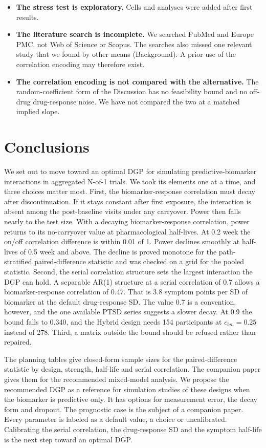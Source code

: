 \documentclass[
  11pt,
]{article}
\begin{document}
\begin{itemize}
  visits is inferred from its plasma half-life, not measured as a
  symptom-response half-life.
\item
  \textbf{The stress test is exploratory.} Cells and analyses were added
  after first results.
\item
  \textbf{The literature search is incomplete.} We searched PubMed and
  Europe PMC, not Web of Science or Scopus. The searches also missed
  one relevant study that we found by other means (Background). A
  prior use of the correlation encoding may therefore exist.
\item
  \textbf{The correlation encoding is not compared with the alternative.}
  The random-coefficient form of the Discussion has no feasibility
  bound and no off-drug drug-response noise. We have not compared the two at
  a matched implied slope.
\end{itemize}

\section{Conclusions}\label{conclusions}

We set out to move toward an optimal DGP for simulating
predictive-biomarker interactions in aggregated N-of-1 trials. We took
its elements one at a time, and three choices matter most. First, the
biomarker-response correlation must decay after discontinuation. If it
stays constant after first exposure, the interaction is absent among
the post-baseline visits under any carryover. Power then falls nearly
to the test size. With a decaying biomarker-response correlation,
power returns to its no-carryover value at pharmacological
half-lives. At 0.2 week the on/off correlation difference is within
0.01 of 1. Power declines smoothly at half-lives of 0.5 week and
above. The decline is proved
monotone for the path-stratified paired-difference statistic and was
checked on a grid for the pooled statistic. Second, the serial
correlation structure sets the largest interaction the DGP can hold. A
separable AR(1) structure at a serial correlation of 0.7 allows a
biomarker-response correlation of 0.47. That is 3.8 symptom points per
SD of biomarker at the default drug-response SD. The value 0.7 is a
convention, however, and the one available PTSD series suggests a
slower decay. At 0.9 the bound falls to 0.340, and
the Hybrid design needs 154 participants at
\(c_{bm} = 0.25\) instead of 278. Third, a
matrix outside the bound should be refused rather than repaired.

The planning tables give closed-form sample sizes for the
paired-difference statistic by design, strength, half-life and serial
correlation. The companion paper gives them for the recommended
mixed-model analysis. We propose the recommended DGP as a reference
for simulation studies of these designs when the biomarker is
predictive only. It has options for measurement error, the decay form
and dropout. The prognostic case is the subject of a companion paper.
Every parameter is labeled as a default value, a choice or
uncalibrated. Calibrating the
serial correlation, the drug-response SD and the symptom half-life is
the next step toward an optimal DGP.
\end{document}
